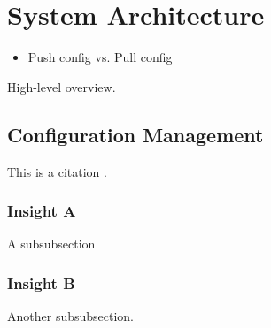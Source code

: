 \section{System Architecture}
	\begin{itemize}
		\item Push config vs. Pull config
	\end{itemize}
High-level overview.

\subsection{Configuration Management}

This is a citation \cite{Lamport:LaTeX}.

\subsubsection{Insight A}

A subsubsection

\subsubsection{Insight B}
Another subsubsection.